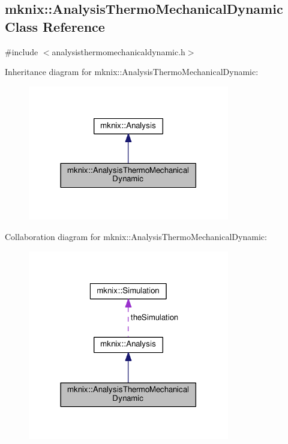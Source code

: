 \hypertarget{classmknix_1_1_analysis_thermo_mechanical_dynamic}{}\subsection{mknix\+:\+:Analysis\+Thermo\+Mechanical\+Dynamic Class Reference}
\label{classmknix_1_1_analysis_thermo_mechanical_dynamic}


{\ttfamily \#include $<$analysisthermomechanicaldynamic.\+h$>$}



Inheritance diagram for mknix\+:\+:Analysis\+Thermo\+Mechanical\+Dynamic\+:\nopagebreak
\begin{figure}[H]
\begin{center}
\leavevmode
\includegraphics[width=249pt]{d8/dee/classmknix_1_1_analysis_thermo_mechanical_dynamic__inherit__graph}
\end{center}
\end{figure}


Collaboration diagram for mknix\+:\+:Analysis\+Thermo\+Mechanical\+Dynamic\+:\nopagebreak
\begin{figure}[H]
\begin{center}
\leavevmode
\includegraphics[width=249pt]{db/d95/classmknix_1_1_analysis_thermo_mechanical_dynamic__coll__graph}
\end{center}
\end{figure}
